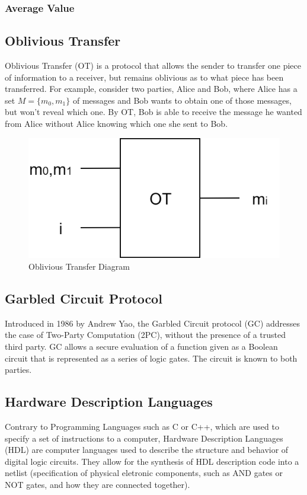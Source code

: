 \begin{refsection}
\subsubsection{Average Value}

\subsection{Oblivious Transfer}
Oblivious Transfer (OT) is a protocol that allows the sender to transfer one piece of information
to a receiver, but remains oblivious as to what piece has been transferred.
For example, consider two parties, Alice and Bob, where Alice has a set $M = \{m_0,m_1\}$ of messages
and Bob wants to obtain one of those messages, but won't reveal which one. By OT, Bob is able to
receive the message he wanted from Alice without Alice knowing which one she sent to Bob.

\renewcommand{\figurename}{Figure}
\begin{figure}[H]
\centering
\includegraphics[width=.4\linewidth]{./sdf/classical_mpc/figures/OT}
\caption{Oblivious Transfer Diagram}
\label{fig:otscheme}
\end{figure}

\subsection{Garbled Circuit Protocol}
Introduced in 1986 by Andrew Yao, the Garbled Circuit protocol (GC) addresses the case
of Two-Party Computation (2PC), without the presence of a trusted third party.
GC allows a secure evaluation of a function given as a Boolean circuit that is represented as a series of logic gates.
The circuit is known to both parties.\\

\subsection{Hardware Description Languages}
Contrary to Programming Languages such as C or C++, which are used to specify a set of instructions to a computer, Hardware Description Languages (HDL) are computer languages used to describe the structure and behavior of digital logic circuits. They allow for the synthesis of HDL description code into a netlist (specification of physical eletronic components, such as AND gates or NOT gates, and how they are connected together).


\end{refsection}
